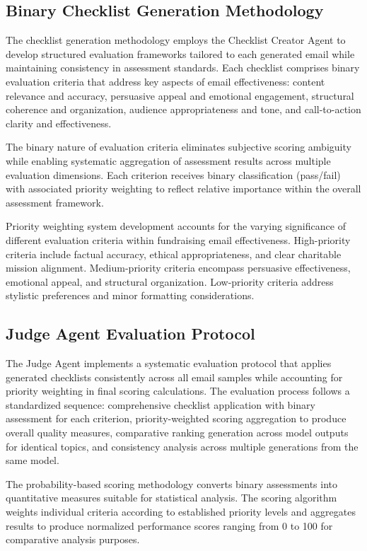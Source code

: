 \subsection{Binary Checklist Generation Methodology}

The checklist generation methodology employs the Checklist Creator Agent to develop structured evaluation frameworks tailored to each generated email while maintaining consistency in assessment standards. Each checklist comprises binary evaluation criteria that address key aspects of email effectiveness: content relevance and accuracy, persuasive appeal and emotional engagement, structural coherence and organization, audience appropriateness and tone, and call-to-action clarity and effectiveness.

The binary nature of evaluation criteria eliminates subjective scoring ambiguity while enabling systematic aggregation of assessment results across multiple evaluation dimensions. Each criterion receives binary classification (pass/fail) with associated priority weighting to reflect relative importance within the overall assessment framework.

Priority weighting system development accounts for the varying significance of different evaluation criteria within fundraising email effectiveness. High-priority criteria include factual accuracy, ethical appropriateness, and clear charitable mission alignment. Medium-priority criteria encompass persuasive effectiveness, emotional appeal, and structural organization. Low-priority criteria address stylistic preferences and minor formatting considerations.

\subsection{Judge Agent Evaluation Protocol}

The Judge Agent implements a systematic evaluation protocol that applies generated checklists consistently across all email samples while accounting for priority weighting in final scoring calculations. The evaluation process follows a standardized sequence: comprehensive checklist application with binary assessment for each criterion, priority-weighted scoring aggregation to produce overall quality measures, comparative ranking generation across model outputs for identical topics, and consistency analysis across multiple generations from the same model.

The probability-based scoring methodology converts binary assessments into quantitative measures suitable for statistical analysis. The scoring algorithm weights individual criteria according to established priority levels and aggregates results to produce normalized performance scores ranging from 0 to 100 for comparative analysis purposes.

